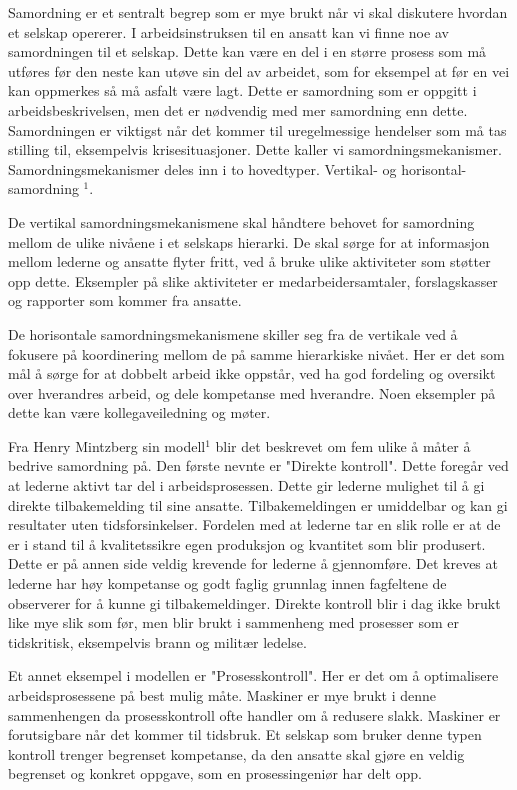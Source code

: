 \documentclass[11]{article}
\begin{document}
Samordning er et sentralt begrep som er mye brukt når vi skal diskutere hvordan et selskap opererer.
I arbeidsinstruksen til en ansatt kan vi finne noe av samordningen til et selskap. Dette kan være en del i en større prosess som må utføres før den neste kan utøve sin del av arbeidet, som for eksempel at før en vei kan oppmerkes så må asfalt være lagt.
Dette er samordning som er oppgitt i arbeidsbeskrivelsen, men det er nødvendig med mer samordning enn dette. 
Samordningen er viktigst når det kommer til uregelmessige hendelser som må tas stilling til, eksempelvis krisesituasjoner.
Dette kaller vi samordningsmekanismer. Samordningsmekanismer deles inn i to hovedtyper. Vertikal- og horisontal-samordning $^1$.

De vertikal samordningsmekanismene skal håndtere behovet for samordning mellom de ulike nivåene i et selskaps hierarki. De skal sørge for at informasjon mellom lederne og ansatte flyter fritt, ved å bruke ulike aktiviteter som støtter opp dette. Eksempler på slike aktiviteter er medarbeidersamtaler, forslagskasser og rapporter som kommer fra ansatte.

De horisontale samordningsmekanismene skiller seg fra de vertikale ved å fokusere på koordinering mellom de på samme hierarkiske nivået. Her er det som mål å sørge for at dobbelt arbeid ikke oppstår, ved ha god fordeling og oversikt over hverandres arbeid, og dele kompetanse med hverandre. Noen eksempler på dette kan være kollegaveiledning og møter. 

Fra Henry Mintzberg sin modell$^1$ blir det beskrevet om fem ulike å måter å bedrive samordning på. Den første nevnte er "Direkte kontroll". Dette foregår ved at lederne aktivt tar del i arbeidsprosessen. Dette gir lederne mulighet til å gi direkte tilbakemelding til sine ansatte. Tilbakemeldingen er umiddelbar og kan gi resultater uten tidsforsinkelser. Fordelen med at lederne tar en slik rolle er at de er i stand til å kvalitetssikre egen produksjon og kvantitet som blir produsert. Dette er på annen side veldig krevende for lederne å gjennomføre. Det kreves at lederne har  høy kompetanse og godt faglig grunnlag innen fagfeltene de observerer for å kunne gi tilbakemeldinger. Direkte kontroll blir i dag ikke brukt like mye slik som før, men blir brukt i sammenheng med prosesser som er tidskritisk, eksempelvis brann og militær ledelse.

Et annet eksempel i modellen er "Prosesskontroll". Her er det om å optimalisere arbeidsprosessene på best mulig måte. Maskiner er mye brukt i denne sammenhengen da prosesskontroll ofte handler om å redusere slakk. Maskiner er forutsigbare når det kommer til tidsbruk. Et selskap som bruker denne typen kontroll trenger begrenset kompetanse, da den ansatte skal gjøre en veldig begrenset og konkret oppgave, som en prosessingeniør har delt opp.
\end{document}
